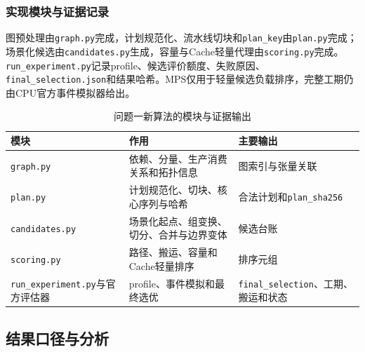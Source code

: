 \subsubsection{实现模块与证据记录}
图预处理由\texttt{graph.py}完成，计划规范化、流水线切块和\texttt{plan\_key}由\texttt{plan.py}完成；场景化候选由\texttt{candidates.py}生成，容量与Cache轻量代理由\texttt{scoring.py}完成。\texttt{run\_experiment.py}记录profile、候选评价额度、失败原因、\texttt{final\_selection.json}和结果哈希。MPS仅用于轻量候选负载排序，完整工期仍由CPU官方事件模拟器给出。

\begin{table}[H]\centering\small
\caption{问题一新算法的模块与证据输出}\label{tab:a-code-map}
\begin{tabularx}{\linewidth}{lYY}\toprule
模块 & 作用 & 主要输出\\\midrule
\texttt{graph.py} & 依赖、分量、生产消费关系和拓扑信息 & 图索引与张量关联\\
\texttt{plan.py} & 计划规范化、切块、核心序列与哈希 & 合法计划和\texttt{plan\_sha256}\\
\texttt{candidates.py} & 场景化起点、组变换、切分、合并与边界变体 & 候选台账\\
\texttt{scoring.py} & 路径、搬运、容量和Cache轻量排序 & 排序元组\\
\texttt{run\_experiment.py}与官方评估器 & profile、事件模拟和最终选优 & \texttt{final\_selection}、工期、搬运和状态\\\bottomrule
\end{tabularx}\end{table}

\subsection{结果口径与分析}
